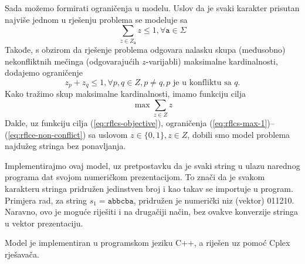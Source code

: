 \documentclass[a4paper, utf8, 11pt, colorlinks]{book}
\begin{document}
Sada možemo formirati ograničenja u modelu. Uslov da je svaki karakter prisutan najviše jednom u rješenju problema se modeluje sa 
\begin{equation}\label{eq:rflcs-max-1}
	 \sum_{z \in  Z_{\texttt{a} }} z \leq 1, \forall \texttt{a} \in \Sigma 
\end{equation}
Takođe, s obzirom da rješenje problema odgovara nalasku skupa (međusobno) nekonfliktnih mečinga (odgovarajućih $z$-varijabli) maksimalne kardinalnosti, dodajemo ograničenje
\begin{equation}\label{eq:rflce-non-conflict}
	 z_{p} + z_q \leq 1, \forall p,q \in Z, p\neq q, p\mbox{ je u konfliktu sa } q.
\end{equation}
Kako tražimo skup maksimalne kardinalnosti, imamo funkciju cilja 
\begin{equation}\label{eq:rflcs-objective}
	 \max \sum_{z \in Z } z 
\end{equation}
Dakle, uz funkciju cilja (\ref{eq:rflcs-objective}), ograničenja (\ref{eq:rflcs-max-1})--(\ref{eq:rflce-non-conflict}) sa uslovom $z \in \{0, 1\}, z \in Z$, dobili smo model problema najdužeg stringa bez ponavljanja. 

 Implementirajmo ovaj model, uz pretpostavku da je svaki string u ulazu narednog programa dat svojom numeričkom prezentacijom. To znači da je svakom karakteru stringa pridružen jedinstven broj i kao takav se importuje u program. Primjera rad, za string $s_1=\texttt{abbcba}$, pridružen je numerički niz (vektor) 011210. Naravno, ovo je moguće riješiti i na drugačiji način, bez ovakve konverzije stringa u vektor prezentaciju. 
 
 Model je implementiran u programskom jeziku C++, a riješen uz pomoć Cplex rješavača. 
 
\end{document}
